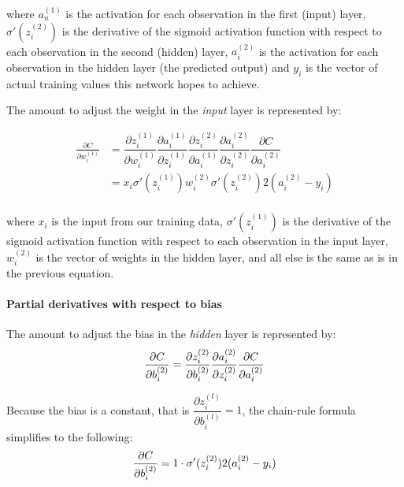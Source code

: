 where \(a_n^{(1)}\) is the activation for each observation in the first
(input) layer, \(\sigma'(z_i^{(2)})\) is the derivative of the sigmoid
activation function with respect to each observation in the second
(hidden) layer, \(a_i^{(2)}\) is the activation for each observation in
the hidden layer (the predicted output) and \(y_i\) is the vector of actual training values
this network hopes to achieve.

The amount to adjust the weight in the \emph{input} layer is
represented by:

    \begin{align*}
\frac{\partial{C}}{\partial{w_i^{(1)}}}    &= \dfrac{\partial{z_i^{(1)}}}{\partial{w_i^{(1)}}} \dfrac{\partial{a_i^{(1)}}}{\partial{z_i^{(1)}}}  \dfrac{\partial{z_i^{(2)}}}{\partial{a_i^{(1)}}}
     \dfrac{\partial{a_i^{(2)}}}{\partial{z_i^{(2)}}}
     \dfrac{\partial{C}}{\partial{a_i^{(2)}}} \\    
&= x_i \sigma'(z_i^{(1)}) w_i^{(2)} \sigma'(z_i^{(2)}) 2(a_i^{(2)}-y_i) \\
     \end{align*}

where \(x_i\) is the input from our training data,
\(\sigma'(z_i^{(1)})\) is the derivative of the sigmoid activation
function with respect to each observation in the input layer,
\(w_i^{(2)}\) is the vector of weights in the hidden layer, and all else
is the same as is in the previous equation.


\hypertarget{partial-derivatives-with-respect-to-bias}{%
\paragraph{Partial derivatives with respect to
bias}\label{partial-derivatives-with-respect-to-bias}}

The amount to adjust the bias in the \emph{hidden} layer is
represented by: \[
\frac{\partial{C}}{\partial{b_i^{(2)}}}  =  \dfrac{\partial{z_i^{(2)}}}{\partial{b_i^{(2)}}}
     \dfrac{\partial{a_i^{(2)}}}{\partial{z_i^{(2)}}}
     \dfrac{\partial{C}}{\partial{a_i^{(2)}}} \\
\]

Because the bias is a constant, that is
\(\dfrac{\partial{z_i^{(l)}}}{\partial{b_i^{(l)}}} = 1\), the chain-rule
formula simplifies to the following: \[
\frac{\partial{C}}{\partial{b_i^{(2)}}} = 1 \cdot \sigma'(z_i^{(2)}) 2(a_i^{(2)}-y_i) \\
\]

